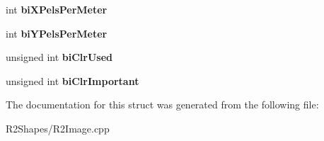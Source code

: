 \begin{DoxyCompactItemize}
\item 
int {\bfseries bi\+X\+Pels\+Per\+Meter}\hypertarget{struct_b_m_p_b_i_t_m_a_p_i_n_f_o_h_e_a_d_e_r_ae2089ea41d1b34c3dfac188a37bab24a}{}\label{struct_b_m_p_b_i_t_m_a_p_i_n_f_o_h_e_a_d_e_r_ae2089ea41d1b34c3dfac188a37bab24a}

\item 
int {\bfseries bi\+Y\+Pels\+Per\+Meter}\hypertarget{struct_b_m_p_b_i_t_m_a_p_i_n_f_o_h_e_a_d_e_r_a31097c9809beb2125967058e6d395e55}{}\label{struct_b_m_p_b_i_t_m_a_p_i_n_f_o_h_e_a_d_e_r_a31097c9809beb2125967058e6d395e55}

\item 
unsigned int {\bfseries bi\+Clr\+Used}\hypertarget{struct_b_m_p_b_i_t_m_a_p_i_n_f_o_h_e_a_d_e_r_ad47d8aeb397ba673f0b8c00a006da012}{}\label{struct_b_m_p_b_i_t_m_a_p_i_n_f_o_h_e_a_d_e_r_ad47d8aeb397ba673f0b8c00a006da012}

\item 
unsigned int {\bfseries bi\+Clr\+Important}\hypertarget{struct_b_m_p_b_i_t_m_a_p_i_n_f_o_h_e_a_d_e_r_aa61d4f7068859ef7c7283f2c338a0b9f}{}\label{struct_b_m_p_b_i_t_m_a_p_i_n_f_o_h_e_a_d_e_r_aa61d4f7068859ef7c7283f2c338a0b9f}

\end{DoxyCompactItemize}


The documentation for this struct was generated from the following file\+:\begin{DoxyCompactItemize}
\item 
R2\+Shapes/R2\+Image.\+cpp\end{DoxyCompactItemize}
